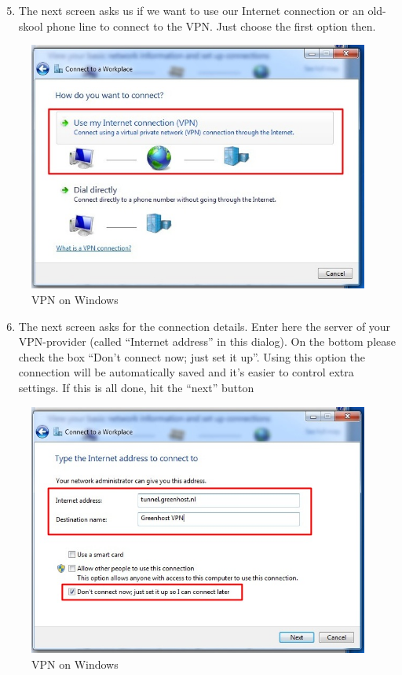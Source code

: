\begin{enumerate}[1.]
\setcounter{enumi}{4}
\item
  The next screen asks us if we want to use our Internet connection or
  an old-skool phone line to connect to the VPN. Just choose the first
  option then.
\end{enumerate}
\begin{figure}[htbp]
\centering
\includegraphics{vpn_windows_04.jpg}
\caption{VPN on Windows}
\end{figure}

\begin{enumerate}[1.]
\setcounter{enumi}{5}
\item
  The next screen asks for the connection details. Enter here the server
  of your VPN-provider (called ``Internet address'' in this dialog). On
  the bottom please check the box ``Don't connect now; just set it up''.
  Using this option the connection will be automatically saved and it's
  easier to control extra settings. If this is all done, hit the
  ``next'' button
\end{enumerate}
\begin{figure}[htbp]
\centering
\includegraphics{vpn_windows_05.jpg}
\caption{VPN on Windows}
\end{figure}

